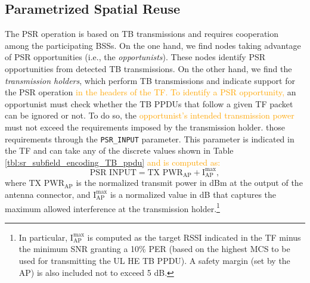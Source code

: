 \documentclass{ieeeaccess}
\begin{document}
\subsection{Parametrized Spatial Reuse}
\label{section:srp_based}	
The PSR operation is based on TB transmissions and requires cooperation among the participating BSSs. On the one hand, we find nodes taking advantage of PSR opportunities (i.e., the \emph{opportunists}). These nodes identify PSR opportunities from detected TB transmissions. On the other hand, we find the \emph{transmission holders}, which perform TB transmissions and indicate support for the PSR operation \textcolor{orange}{in the headers of the TF. To identify a PSR opportunity,} an opportunist must check whether the TB PPDUs that follow a given TF packet can be ignored or not. To do so, the \textcolor{orange}{opportunist's intended transmission power} must not exceed the requirements imposed by the transmission holder.  those requirements through the \texttt{PSR\_INPUT} parameter. This parameter is indicated in the TF and can take any of the discrete values shown in Table \ref{tbl:sr_subfield_encoding_TB_ppdu} \textcolor{orange}{and is computed as:}
\begin{equation}
\text{PSR INPUT} = \text{TX PWR}_\text{AP} + \text{I}_\text{AP}^{\max},
\label{eq:srp_input}
\nonumber
\end{equation}
where $\text{TX PWR}_\text{AP}$ is the normalized transmit power in dBm at the output of the antenna connector, and $\text{I}_\text{AP}^{\max}$ is a normalized value in dB that captures the maximum allowed interference at the transmission holder.\footnote{In particular, $\text{I}_\text{AP}^{\max}$ is computed as the target RSSI indicated in the TF minus the minimum SNR granting a 10\% PER (based on the highest MCS to be used for transmitting the UL HE TB PPDU). A safety margin (set by the AP) is also included not to exceed 5 dB.}
\end{document}
